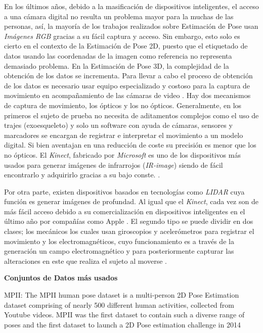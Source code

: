 En los últimos años, debido a la masificación
de dispositivos inteligentes, el acceso a una cámara digital no resulta un problema mayor para la muchas
de las personas, así, la mayoría de los trabajos realizados sobre Estimación de Pose usan
\textit{Imágenes RGB} gracias a su fácil captura y acceso.
Sin embargo, esto solo es cierto en el contexto de la Estimación de Pose 2D, puesto que el etiquetado de datos
usando las coordenadas de la imagen como referencia no representa demasiado problema. En la
Estimación de Pose 3D, la complejidad de la obtención de los datos se incrementa. Para llevar a cabo
el proceso de obtención de los datos es necesario usar equipo especializado y costoso para la captura
de movimiento en acompañamiento de las cámaras de video \cite{6682899}. Hay dos mecanismos de captura
de movimiento, los ópticos y los no ópticos. Generalmente, en los primeros el sujeto de prueba no
necesita de aditamentos complejos como el uso de trajes
(exoesqueleto) y solo un software con ayuda de cámaras, sensores y marcadores se
encargan de registrar e interpretar el movimiento a un modelo digital. Si bien
aventajan en una reducción de coste su precisión es menor que los no ópticos.
El \textit{Kinect}, fabricado por \textit{Microsoft} es uno de los dispositivos más usados
para generar imágenes de infrarrojos (\textit{IR-image}) siendo de fácil encontrarlo y adquirirlo
gracias a su bajo conste. \cite{6165146} \cite{Izadi11kinectfusion:real-time}.

Por otra parte, existen dispositivos basados en tecnologías como \textit{LIDAR} cuya función es
generar imágenes de profundad. Al igual que el \textit{Kinect}, cada vez son de más fácil acceso
debido a su comercialización en dispositivos inteligentes en el último año por compañías como Apple
\cite{DBLP:journals/corr/abs-1711-06396}. El segundo tipo se puede dividir en dos clases;
los mecánicos los cuales usan giroscopios y acelerómetros para registrar el
movimiento y los electromagnéticos, cuyo funcionamiento es a través de la generación un campo
electromagnético y para posteriormente capturar las alteraciones en este que realiza el sujeto al
moverse \cite{articleMotion}.

\textbf{Conjuntos de Datos más usados}

MPII: The MPII human pose dataset is a multi-person 2D Pose Estimation dataset comprising of nearly
500 different human activities, collected from Youtube videos. MPII was the first dataset to contain
such a diverse range of poses and the first dataset to launch a 2D Pose estimation challenge in 2014

